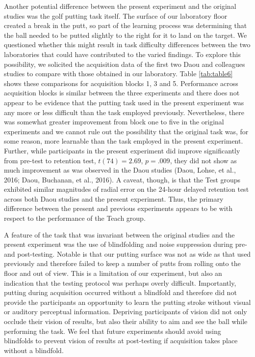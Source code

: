 \documentclass[
  english,
  man,floatsintext]{apa7}
\begin{document}
Another potential difference between the present experiment and the original studies was the golf putting task itself. The surface of our laboratory floor created a break in the putt, so part of the learning process was determining that the ball needed to be putted slightly to the right for it to land on the target. We questioned whether this might result in task difficulty differences between the two laboratories that could have contributed to the varied findings. To explore this possibility, we solicited the acquisition data of the first two Daou and colleagues studies to compare with those obtained in our laboratory. Table \ref{tab:table6} shows these comparisons for acquisition blocks 1, 3 and 5. Performance across acquisition blocks is similar between the three experiments and there does not appear to be evidence that the putting task used in the present experiment was any more or less difficult than the task employed previously. Nevertheless, there was somewhat greater improvement from block one to five in the original experiments and we cannot rule out the possibility that the original task was, for some reason, more learnable than the task employed in the present experiment. Further, while participants in the present experiment did improve significantly from pre-test to retention test, \(t(74) = 2.69\), \(p = .009\), they did not show as much improvement as was observed in the Daou studies (Daou, Lohse, et al., 2016; Daou, Buchanan, et al., 2016). A caveat, though, is that the Test groups exhibited similar magnitudes of radial error on the 24-hour delayed retention test across both Daou studies and the present experiment. Thus, the primary difference between the present and previous experiments appears to be with respect to the performance of the Teach group.

A feature of the task that was invariant between the original studies and the present experiment was the use of blindfolding and noise suppression during pre- and post-testing. Notable is that our putting surface was not as wide as that used previously and therefore failed to keep a number of putts from rolling onto the floor and out of view. This is a limitation of our experiment, but also an indication that the testing protocol was perhaps overly difficult. Importantly, putting during acquisition occurred without a blindfold and therefore did not provide the participants an opportunity to learn the putting stroke without visual or auditory perceptual information. Depriving participants of vision did not only occlude their vision of results, but also their ability to aim and see the ball while performing the task. We feel that future experiments should avoid using blindfolds to prevent vision of results at post-testing if acquisition takes place without a blindfold.
\end{document}
